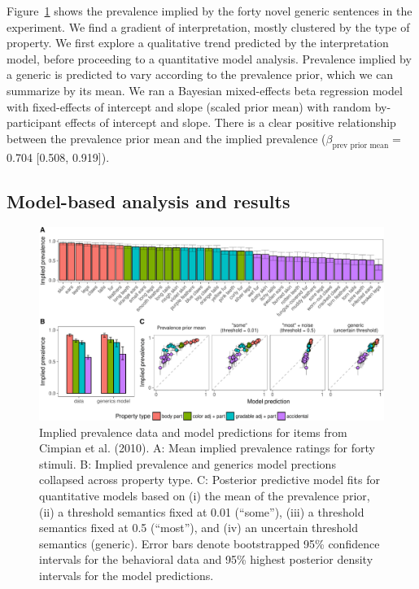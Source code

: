 \documentclass[floatsintext,man]{apa6}
\theoremstyle{definition}
\theoremstyle{definition}
\theoremstyle{definition}
\theoremstyle{remark}
\begin{document}
Figure~\ref{fig:cimpian-modelingResults} shows the prevalence implied by
the forty novel generic sentences in the experiment. We find a gradient
of interpretation, mostly clustered by the type of property. We first
explore a qualitative trend predicted by the interpretation model,
before proceeding to a quantitative model analysis. Prevalence implied
by a generic is predicted to vary according to the prevalence prior,
which we can summarize by its mean. We ran a Bayesian mixed-effects beta
regression model with fixed-effects of intercept and slope (scaled prior
mean) with random by-participant effects of intercept and slope. There
is a clear positive relationship between the prevalence prior mean and
the implied prevalence (\(\beta_{\text{prev prior mean}}=\) 0.704
{[}0.508, 0.919{]}).

\subsection{Model-based analysis and
results}\label{model-based-analysis-and-results}

\begin{figure}
\centering
\includegraphics{genint_files/figure-latex/cimpian-modelingResults-1.pdf}
\caption{\label{fig:cimpian-modelingResults}Implied prevalence data and
model predictions for items from Cimpian et al. (2010). A: Mean implied
prevalence ratings for forty stimuli. B: Implied prevalence and generics
model prections collapsed across property type. C: Posterior predictive
model fits for quantitative models based on (i) the mean of the
prevalence prior, (ii) a threshold semantics fixed at 0.01
(\enquote{some}), (iii) a threshold semantics fixed at 0.5
(\enquote{most}), and (iv) an uncertain threshold semantics (generic).
Error bars denote bootstrapped 95\% confidence intervals for the
behavioral data and 95\% highest posterior density intervals for the
model predictions.}
\end{figure}
\end{document}
